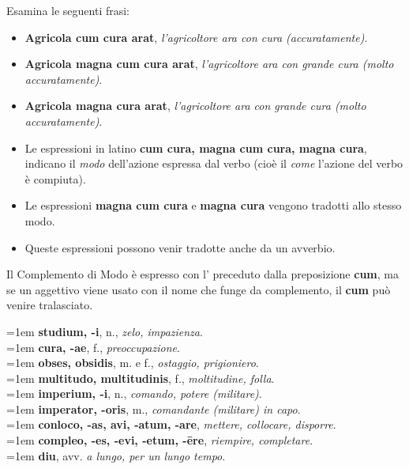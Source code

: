 \documentclass[nols]{tufte-handout}
\newcommand{\abl}{\textsc{abl}\xspace}
\newcommand{\textls}[2][5]{%
    \begingroup\addfontfeatures{LetterSpace=#1}#2\endgroup
  }
\renewcommand{\smallcapsspacing}[1]{\textls[10]{#1}}
\renewcommand{\textsc}[1]{\smallcapsspacing{\textsmallcaps{#1}}}
\begin{document}

 Esamina le seguenti frasi:
\begin{itemize}
\item[\textsc{1.}] \textbf{Agricola cum cura arat}, \textit{l'agricoltore ara con cura (accuratamente)}.  
\item[\textsc{2.}] \textbf{Agricola magna cum cura arat}, \textit{l'agricoltore ara con grande cura (molto accuratamente)}.  
\item[\textsc{3.}] \textbf{Agricola magna cura arat}, \textit{l'agricoltore ara con grande cura (molto accuratamente)}.    
\end{itemize}


\begin{itemize}
\item[\textsc{1.}] Le espressioni in latino \textbf{cum cura, magna cum cura, magna cura}, indicano il \textit{modo} dell'azione espressa dal verbo (cioè il \textit{come} l'azione del verbo è compiuta).  
\item[\textsc{2.}] Le espressioni \textbf{magna cum cura} e \textbf{magna cura} vengono tradotti allo stesso modo.      
\item[\textsc{2.}] Queste espressioni possono venir tradotte anche da un avverbio.      
\end{itemize}


 Il Complemento di Modo è espresso con l'\abl preceduto dalla preposizione \textbf{cum}, ma se un aggettivo viene usato con il nome che funge da complemento, il \textbf{cum} può venire tralasciato.


\begin{multicols}{2}
    \noindent \hangindent=1em \textbf{studium, -i}, n., \textit{zelo, impazienza}.  \\
    \noindent \hangindent=1em \textbf{cura, -ae}, f., \textit{preoccupazione}.  \\
	\noindent \hangindent=1em \textbf{obses, obsidis}, m. e f., \textit{ostaggio, prigioniero}.  \\
	\noindent \hangindent=1em \textbf{multitudo, multitudinis}, f., \textit{moltitudine, folla}.  \\
	\noindent \hangindent=1em \textbf{imperium, -i}, n., \textit{comando, potere (militare)}.  \\
	\noindent \hangindent=1em \textbf{imperator, -oris}, m., \textit{comandante (militare) in capo}.  \\
	\noindent \hangindent=1em \textbf{conloco, -as, avi, -atum, -are}, \textit{mettere, collocare, disporre}.  \\
	\noindent \hangindent=1em \textbf{compleo, -es, -evi, -etum, -ēre}, \textit{riempire, completare}.  \\
    \noindent \hangindent=1em \textbf{diu}, avv. \textit{a lungo, per un lungo tempo}.     \\
	
\end{multicols}
\end{document}
